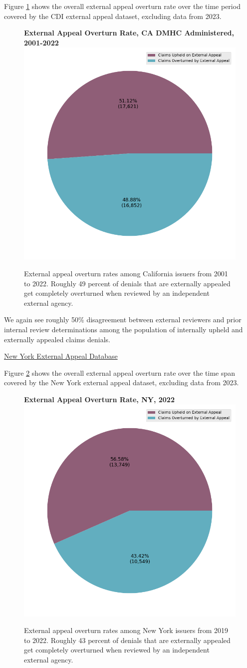 \documentclass[12pt, a4paper,twoside]{report}
\theoremstyle{plain} %
\theoremstyle{definition} %
\theoremstyle{remark} %
\numberwithin{equation}{chapter}
\begin{document}
		Figure \ref{cadmhcexternalappealpie} shows the overall external appeal overturn rate over the time period covered by the CDI external appeal dataset, excluding data from 2023.
		
		
		\begin{figure}[h!]
			\centering
			\textbf{External Appeal Overturn Rate, CA DMHC Administered, 2001-2022}
			\includegraphics[width=.4\textwidth]{images/ca_dmhc_external_appeals/external_appeal_success_rates.png}
			\caption{External appeal overturn rates among California issuers from 2001 to 2022. Roughly 49 percent of denials that are externally appealed get completely overturned when reviewed by an independent external agency.}
			\label{cadmhcexternalappealpie}
		\end{figure}
	
		We again see roughly 50\% disagreement between external reviewers and prior internal review determinations among the population of internally upheld and externally appealed claims denials.
		
		\underline{New York External Appeal Database}
		
		Figure \ref{nyexternalappealpie} shows the overall external appeal overturn rate over the time span covered by the New York external appeal dataset, excluding data from 2023.
		
		
		\begin{figure}[h!]
			\centering
			\textbf{External Appeal Overturn Rate, NY, 2022}
			\includegraphics[width=.4\textwidth]{images/nys_external/external_appeal_success_rates.png}
			\caption{External appeal overturn rates among New York issuers from 2019 to 2022. Roughly 43 percent of denials that are externally appealed get completely overturned when reviewed by an independent external agency.}
			\label{nyexternalappealpie}
		\end{figure}
		
\end{document}

